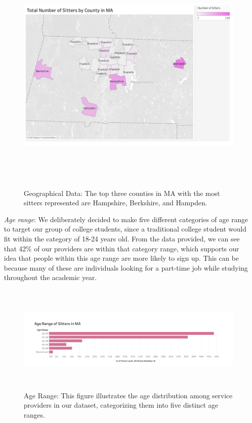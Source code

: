 \documentclass[12pt]{article}
\begin{document}
\begin{figure}
\centering
\includegraphics[width=5.20833in,height=4.6875in]{IMAGES/totalnumbersofsitter.png}
\caption{Geographical Data: The top three counties in MA with the most
sitters represented are Hampshire, Berkshire, and Hampden.}
\end{figure}

\newpage

\emph{Age range}: We deliberately decided to make five different
categories of age range to target our group of college students, since a
traditional college student would fit within the category of 18-24 years
old. From the data provided, we can see that 42\% of our providers are
within that category range, which supports our idea that people within
this age range are more likely to sign up. This can be because many of
these are individuals looking for a part-time job while studying
throughout the academic year.

\begin{figure}
\centering
\includegraphics[width=6.25in,height=2.08333in]{IMAGES/agerangeofsitters.png}
\caption{Age Range: This figure illustrates the age distribution among
service providers in our dataset, categorizing them into five distinct
age ranges.}
\end{figure}
\end{document}
